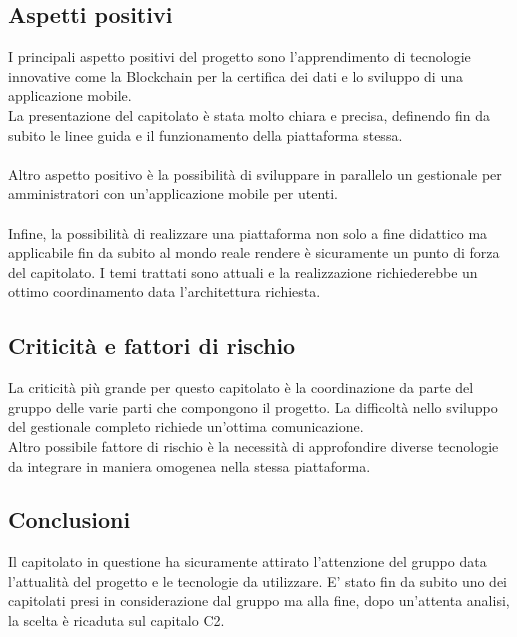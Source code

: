\subsection{Aspetti positivi}
I principali aspetto positivi del progetto sono l'apprendimento di tecnologie innovative come la Blockchain per la certifica dei dati e lo sviluppo di una applicazione mobile.\\
La presentazione del capitolato è stata molto chiara e precisa, definendo fin da subito le linee guida e il funzionamento della piattaforma stessa. \\\\
Altro aspetto positivo è la possibilità di sviluppare in parallelo un gestionale per amministratori con un'applicazione mobile per utenti.\\\\
Infine, la possibilità di realizzare una piattaforma non solo a fine didattico ma applicabile fin da subito al mondo reale rendere è sicuramente un punto di forza del capitolato. I temi trattati sono attuali e la realizzazione richiederebbe un ottimo coordinamento data l'architettura richiesta.


\subsection{Criticità e fattori di rischio}
La criticità più grande per questo capitolato è la coordinazione da parte del gruppo delle varie parti che compongono il progetto. La difficoltà nello sviluppo del gestionale completo richiede un'ottima comunicazione. \\
Altro possibile fattore di rischio è la necessità di approfondire diverse tecnologie da integrare in maniera omogenea nella stessa piattaforma.

\subsection{Conclusioni}
Il capitolato in questione ha sicuramente attirato l'attenzione del gruppo data l'attualità del progetto e le tecnologie da utilizzare. E' stato fin da subito uno dei capitolati presi in considerazione dal gruppo ma alla fine, dopo un'attenta analisi, la scelta è ricaduta sul capitalo C2. 

\newpage